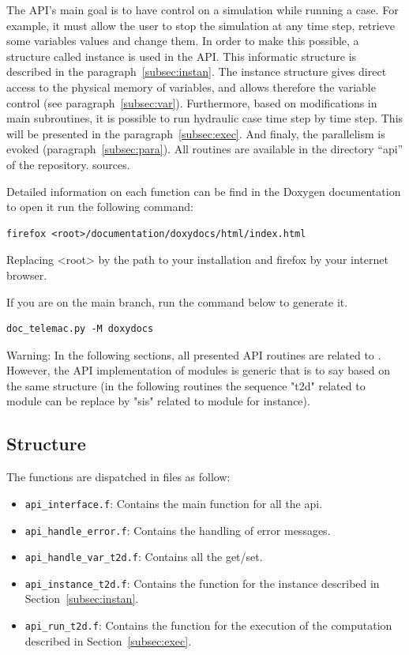 The API’s main goal is to have control on a simulation while running a case.
For example, it must allow the user to stop the simulation at any time step,
retrieve some variables values and change them. In order to make this possible,
a \fortran{} structure called instance is used in the API\@. This informatic
structure is described in the paragraph~\ref{subsec:instan}. The instance
structure gives direct access to the physical memory of variables, and allows
therefore the variable control (see paragraph~\ref{subsec:var}). Furthermore,
based on modifications in \telemacsystem{} main subroutines, it is possible to
run hydraulic case time step by time step. This will be
presented in the paragraph~\ref{subsec:exec}. And finaly, the parallelism is
evoked (paragraph~\ref{subsec:para}).
All \fortran{} routines are available in the directory ``api'' of the
\telemacsystem{} repository.
sources.

Detailed information on each function can be find in the Doxygen documentation
to open it run the following command:

\begin{lstlisting}
firefox <root>/documentation/doxydocs/html/index.html
\end{lstlisting}

Replacing <root> by the path to your installation and firefox by your internet
browser.

If you are on the main branch, run the command below to generate it.

\begin{lstlisting}
doc_telemac.py -M doxydocs
\end{lstlisting}

\begin{WarningBlock}{Warning:}
\centering
 In the following sections, all presented API routines are related to
 . However, the API implementation of \telemacsystem{} modules is
 generic that is to say based on the same structure (in the following routines
 the sequence "t2d" related to  module can be replace by "sis"
  related to \sisyphe{} module for instance).
\end{WarningBlock}

\subsection{Structure}

The functions are dispatched in \fortran{} files as follow:
\begin{itemize}
  \item \verb!api_interface.f!: Contains the main function for all the api.
  \item \verb!api_handle_error.f!: Contains the handling of error messages.
  \item \verb!api_handle_var_t2d.f!: Contains all the get/set.
  \item \verb!api_instance_t2d.f!: Contains the function for the instance
    described in Section~\ref{subsec:instan}.
  \item \verb!api_run_t2d.f!: Contains the function for the execution of the
    computation described in Section~\ref{subsec:exec}.
\end{itemize}

